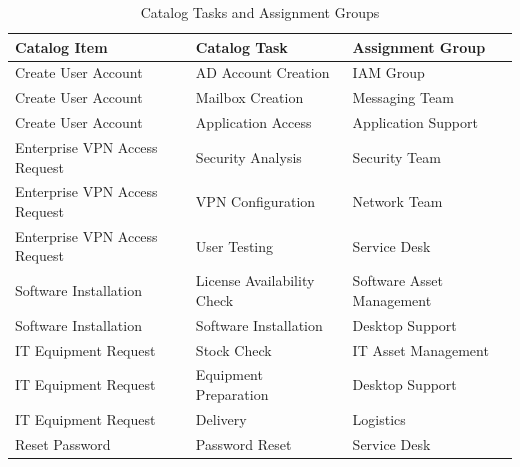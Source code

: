 \documentclass[12pt,a4paper]{report}
\begin{document}
\begin{table}[H]
    \centering
    \renewcommand{\arraystretch}{1.3}
    \begin{tabularx}{\textwidth}{|
        >{\raggedright\arraybackslash}p{4.5cm}|
        >{\raggedright\arraybackslash}p{5.5cm}|X|}
        \hline
        \textbf{Catalog Item} &
        \textbf{Catalog Task} &
        \textbf{Assignment Group} \\
        \hline

        Create User Account &
        AD Account Creation &
        IAM Group \\
        \hline

        Create User Account &
        Mailbox Creation &
        Messaging Team \\
        \hline

        Create User Account &
        Application Access &
        Application Support \\
        \hline

        Enterprise VPN Access Request &
        Security Analysis &
        Security Team \\
        \hline

        Enterprise VPN Access Request &
        VPN Configuration &
        Network Team \\
        \hline

        Enterprise VPN Access Request &
        User Testing &
        Service Desk \\
        \hline

        Software Installation &
        License Availability Check &
        Software Asset Management \\
        \hline

        Software Installation &
        Software Installation &
        Desktop Support \\
        \hline

        IT Equipment Request &
        Stock Check &
        IT Asset Management \\
        \hline

        IT Equipment Request &
        Equipment Preparation &
        Desktop Support \\
        \hline

        IT Equipment Request &
        Delivery &
        Logistics \\
        \hline

        Reset Password &
        Password Reset &
        Service Desk \\
        \hline

    \end{tabularx}
    \caption{Catalog Tasks and Assignment Groups}
    \label{tab:catalog-tasks-assignment}
\end{table}
\end{document}
